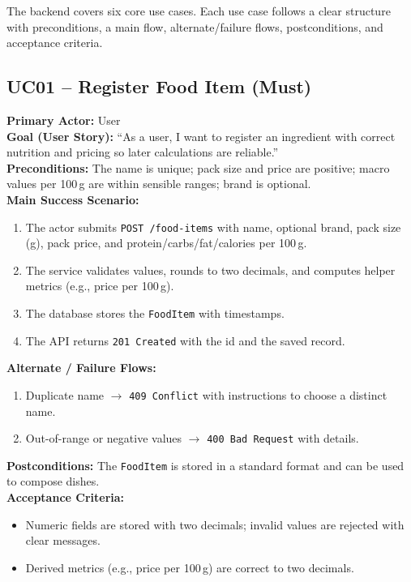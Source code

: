 \documentclass[11pt]{article}
\begin{document}
The backend covers six core use cases. Each use case follows a clear structure with preconditions, a main flow, alternate/failure flows, postconditions, and acceptance criteria.

\subsection*{UC01 -- Register Food Item (Must)}
\textbf{Primary Actor:} User\\
\textbf{Goal (User Story):} ``As a user, I want to register an ingredient with correct nutrition and pricing so later calculations are reliable.''\\
\textbf{Preconditions:} The name is unique; pack size and price are positive; macro values per 100\,g are within sensible ranges; brand is optional.\\
\textbf{Main Success Scenario:}
\begin{enumerate}[label=\arabic*.]
  \item The actor submits \texttt{POST /food-items} with name, optional brand, pack size (g), pack price, and protein/carbs/fat/calories per 100\,g.
  \item The service validates values, rounds to two decimals, and computes helper metrics (e.g., price per 100\,g).
  \item The database stores the \texttt{FoodItem} with timestamps.
  \item The API returns \texttt{201 Created} with the id and the saved record.
\end{enumerate}
\textbf{Alternate / Failure Flows:}
\begin{enumerate}[label=\arabic*F.]
  \item Duplicate name $\rightarrow$ \texttt{409 Conflict} with instructions to choose a distinct name.
  \item Out-of-range or negative values $\rightarrow$ \texttt{400 Bad Request} with details.
\end{enumerate}
\textbf{Postconditions:} The \texttt{FoodItem} is stored in a standard format and can be used to compose dishes.\\
\textbf{Acceptance Criteria:}
\begin{itemize}[noitemsep]
  \item Numeric fields are stored with two decimals; invalid values are rejected with clear messages.
  \item Derived metrics (e.g., price per 100\,g) are correct to two decimals.
\end{itemize}
\end{document}
